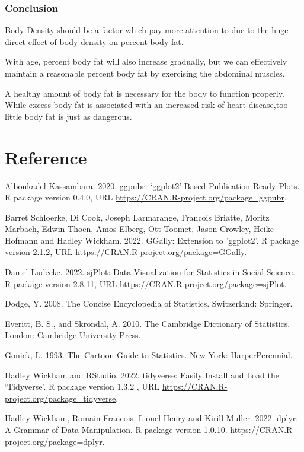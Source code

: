 \documentclass[letterpaper,9pt,twocolumn,twoside,]{pinp}
\begin{document}
\hypertarget{conclusion}{%
\subsubsection{Conclusion}\label{conclusion}}

Body Density should be a factor which pay more attention to due to the
huge direct effect of body density on percent body fat.

With age, percent body fat will also increase gradually, but we can
effectively maintain a reasonable percent body fat by exercising the
abdominal muscles.

A healthy amount of body fat is necessary for the body to function
properly. While excess body fat is associated with an increased risk of
heart disease,too little body fat is just as dangerous.

\hypertarget{reference}{%
\section{Reference}\label{reference}}

Alboukadel Kassambara. 2020. ggpubr: `ggplot2' Based Publication Ready
Plots. R package version 0.4.0, URL
\url{https://CRAN.R-project.org/package=ggpubr}.

Barret Schloerke, Di Cook, Joseph Larmarange, Francois Briatte, Moritz
Marbach, Edwin Thoen, Amos Elberg, Ott Toomet, Jason Crowley, Heike
Hofmann and Hadley Wickham. 2022. GGally: Extension to 'ggplot2'. R
package version 2.1.2, URL
\url{https://CRAN.R-project.org/package=GGally}.

Daniel Ludecke. 2022. sjPlot: Data Visualization for Statistics in
Social Science. R package version 2.8.11, URL
\url{https://CRAN.R-project.org/package=sjPlot}.

Dodge, Y. 2008. The Concise Encyclopedia of Statistics. Switzerland:
Springer.

Everitt, B. S., and Skrondal, A. 2010. The Cambridge Dictionary of
Statistics. London: Cambridge University Press.

Gonick, L. 1993. The Cartoon Guide to Statistics. New York:
HarperPerennial.

Hadley Wickham and RStudio. 2022. tidyverse: Easily Install and Load the
`Tidyverse'. R package version 1.3.2 , URL
\url{https://CRAN.R-project.org/package=tidyverse}.

Hadley Wickham, Romain Francois, Lionel Henry and Kirill Muller. 2022.
dplyr: A Grammar of Data Manipulation. R package version 1.0.10.
\url{https://CRAN.R-} project.org/package=dplyr.
\end{document}
